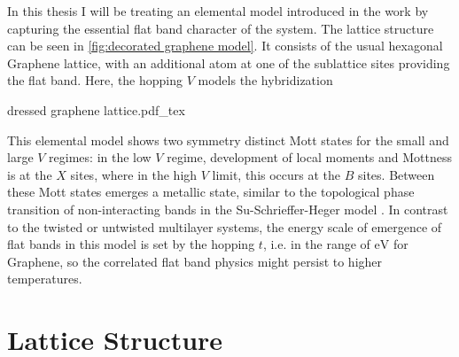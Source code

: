 \documentclass[../notes.tex]{subfiles}
\begin{document}
In this thesis I will be treating an elemental model introduced in the work by \citeauthor{wittQuantumGeometryLocal2025} capturing the essential flat band character of the system.
The lattice structure can be seen in \cref{fig:decorated graphene model}.
It consists of the usual hexagonal Graphene lattice, with an additional atom at one of the sublattice sites providing the flat band.
Here, the hopping \(V\) models the hybridization 
\begin{SCfigure}[50][t]
	\centering
	{dressed graphene lattice.pdf_tex}
	\caption{\textbf{Lattice structure of decorated graphene honeycomb lattice.} with impurity X hybridized to sublattice site A. Only hopping t between sublattices A and B as well as V between X and A exist. Created using VESTA \cite{mommaVESTA3Threedimensional2011}.}
	\label{fig:decorated graphene model}
\end{SCfigure}

This elemental model shows two symmetry distinct Mott states for the small and large \(V\) regimes: in the low \(V\) regime, development of local moments and Mottness is at the \(X\) sites, where in the high \(V\) limit, this occurs at the \(B\) sites.
Between these Mott states emerges a metallic state, similar to the topological phase transition of non-interacting bands in the Su-Schrieffer-Heger model \cite{suSolitonExcitationsPolyacetylene1980}. 
In contrast to the twisted or untwisted multilayer systems, the energy scale of emergence of flat bands in this model is set by the hopping \(t\), i.e. in the range of \(\unit{\electronvolt}\) for Graphene, so the correlated flat band physics might persist to higher temperatures.

\section{Lattice Structure}\label{sec:lattice and band structure}
\end{document}
